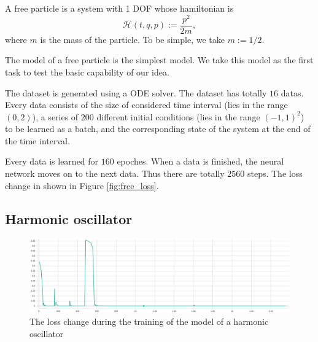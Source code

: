 \documentclass{article}
\begin{document}
A free particle is a system with 1 DOF whose hamiltonian is \cite[p. 133]{landau1976mechanics}\cite[p. 66]{arnold1989mathmech}
\begin{equation*}
	\mathcal H\left(t,q,p\right):=\frac{p^2}{2m},
\end{equation*}
where $m$ is the mass of the particle.
To be simple, we take $m:=1/2$.

The model of a free particle is the simplest model.
We take this model as the first task to test the basic capability of our idea.

The dataset is generated using a ODE solver.
The dataset has totally $16$ datas.
Every data consists of the size of considered time interval
(lies in the range $\left(0,2\right)$),
a series of $200$ different initial conditions
(lies in the range $\left(-1,1\right)^2$)
to be learned as a batch,
and the corresponding state of the system at the end of the time interval.

Every data is learned for $160$ epoches.
When a data is finished, the neural network moves on to the next data.
Thus there are totally $2560$ steps.
The loss change in shown in Figure \ref{fig:free_loss}.

\subsection{Harmonic oscillator}

\begin{figure}[h]
	\centering
	\includegraphics[width=\linewidth]{spring_loss.png}
	\caption{The loss change during the training of the model of a harmonic oscillator}
	\label{fig:spring_loss}
\end{figure}
\end{document}
